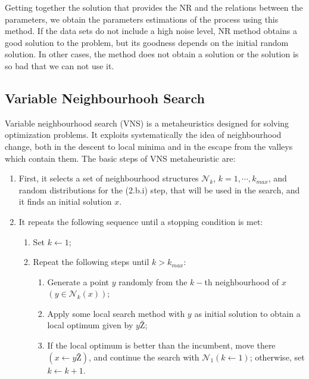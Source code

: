 \documentclass{sig-alternate}
\begin{document}
Getting together the solution that provides the NR and the relations between the parameters, we obtain the parameters estimations of the process using this method. If the data sets do not include a high noise level, NR method obtains a good solution to the problem, but its goodness depends on the initial random solution. In other cases, the method does not obtain a solution or the solution is so bad that we can not use it.



\subsection{Variable Neighbourhooh Search}

Variable neighbourhood search (VNS) \cite{VNS} is a metaheuristics designed for solving optimization problems. It exploits systematically the idea of neighbourhood change, both in the descent to local minima and in the escape from the valleys which contain them. The basic steps of VNS metaheuristic are:

\begin{enumerate}
\item First, it selects a set of neighbourhood structures $\mathcal N_k$, $k=1,\cdots,k_{max}$, and random distributions for the (2.b.i) step, that will be used in the search, and it finds an initial solution $x$.
\item It repeats the following sequence until a stopping condition is met:
    \begin{enumerate}
        \item Set $k\leftarrow 1$;
        \item Repeat the following steps until $k>k_{max}$:
        \begin{enumerate}
            \item Generate a point $y$ randomly from the $k-$th neighbourhood of $x$ $(y\in\mathcal N_{k}(x))$;
                \item Apply some local search method with $y$ as initial solution to obtain a local optimum given by $yŽ$;
                \item If the local optimum is better than the incumbent, move there $(x\leftarrow yŽ)$, and continue the search with $\mathcal N_1 (k\leftarrow 1)$; otherwise, set $k\leftarrow k+1$.
        \end{enumerate}
    \end{enumerate}

\end{enumerate}
\end{document}
